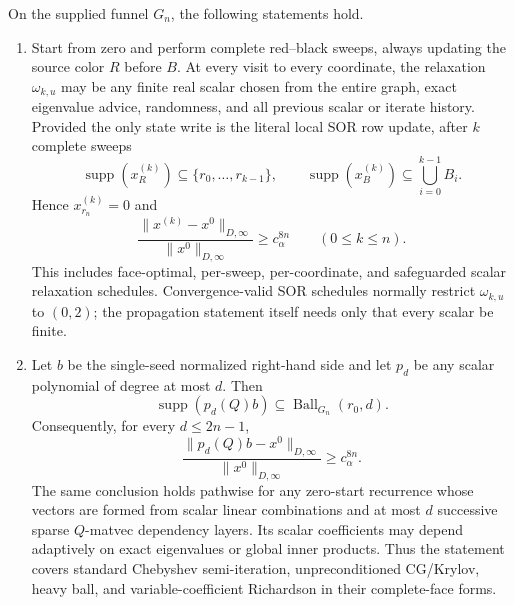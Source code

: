 \begin{theorem}
\label{thm:adaptive-polynomial-propagation-stop}
On the supplied funnel $G_n$, the following statements hold.

\begin{enumerate}[label=(\roman*),leftmargin=*]
\item Start from zero and perform complete red--black sweeps, always updating
      the source color $R$ before $B$.  At every visit to every coordinate,
      the relaxation $\omega_{k,u}$ may be any finite real scalar chosen from
      the entire graph, exact eigenvalue advice, randomness, and all previous
      scalar or iterate history.  Provided the only state write is the literal
      local SOR row update, after $k$ complete sweeps
      \begin{equation}
       \operatorname{supp}(x_R^{(k)})\subseteq\{r_0,\ldots,r_{k-1}\},
       \qquad
       \operatorname{supp}(x_B^{(k)})
       \subseteq\bigcup_{i=0}^{k-1}B_i.
       \label{eq:adaptive-sor-light-cone}
      \end{equation}
      Hence $x_{r_n}^{(k)}=0$ and
      \begin{equation}
       \frac{\|x^{(k)}-x^0\|_{D,\infty}}
            {\|x^0\|_{D,\infty}}
       \ge c_\alpha^{8n}
       \qquad(0\le k\le n).
       \label{eq:adaptive-sor-stop}
      \end{equation}
      This includes face-optimal, per-sweep, per-coordinate, and safeguarded
      scalar relaxation schedules.  Convergence-valid SOR schedules normally
      restrict $\omega_{k,u}$ to $(0,2)$; the propagation statement itself
      needs only that every scalar be finite.

\item Let $b$ be the single-seed normalized right-hand side and let $p_d$ be
      any scalar polynomial of degree at most $d$.  Then
      \begin{equation}
       \operatorname{supp}(p_d(Q)b)
       \subseteq \operatorname{Ball}_{G_n}(r_0,d).
       \label{eq:source-polynomial-light-cone}
      \end{equation}
      Consequently, for every $d\le2n-1$,
      \begin{equation}
       \frac{\|p_d(Q)b-x^0\|_{D,\infty}}
            {\|x^0\|_{D,\infty}}
       \ge c_\alpha^{8n}.
       \label{eq:source-polynomial-stop}
      \end{equation}
      The same conclusion holds pathwise for any zero-start recurrence whose
      vectors are formed from scalar linear combinations and at most $d$
      successive sparse $Q$-matvec dependency layers.  Its scalar
      coefficients may depend adaptively on exact eigenvalues or global inner
      products.  Thus the statement covers standard Chebyshev
      semi-iteration, unpreconditioned CG/Krylov, heavy ball, and
      variable-coefficient Richardson in their complete-face forms.
\end{enumerate}


\end{theorem}
